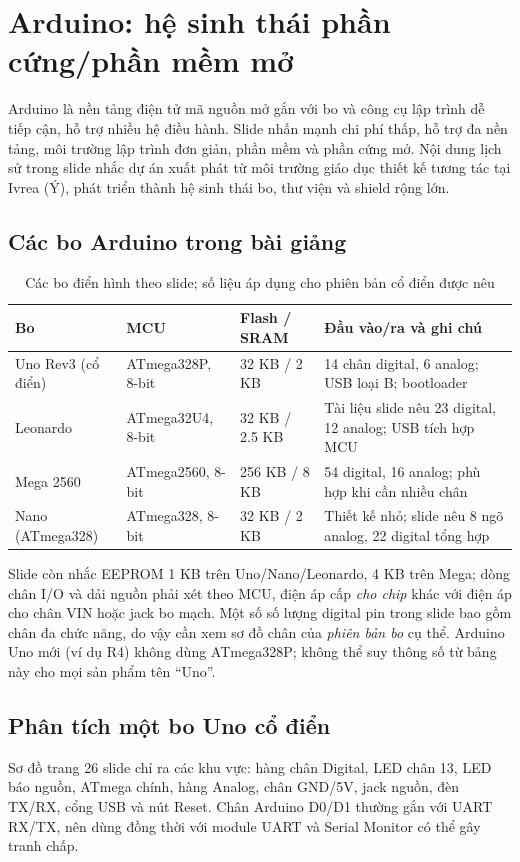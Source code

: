 \section{Arduino: hệ sinh thái phần cứng/phần mềm mở}
Arduino là nền tảng điện tử mã nguồn mở gắn với bo và công cụ lập trình dễ tiếp cận, hỗ trợ nhiều hệ điều hành. Slide nhấn mạnh chi phí thấp, hỗ trợ đa nền tảng, môi trường lập trình đơn giản, phần mềm và phần cứng mở. Nội dung lịch sử trong slide nhắc dự án xuất phát từ môi trường giáo dục thiết kế tương tác tại Ivrea (Ý), phát triển thành hệ sinh thái bo, thư viện và shield rộng lớn.

\subsection{Các bo Arduino trong bài giảng}
\begin{table}[htbp]\centering\footnotesize
\caption{Các bo điển hình theo slide; số liệu áp dụng cho phiên bản cổ điển được nêu}
\begin{tabularx}{\textwidth}{p{24mm}p{29mm}p{27mm}X}
\toprule
Bo & MCU & Flash / SRAM & Đầu vào/ra và ghi chú\\\midrule
Uno Rev3 (cổ điển) & ATmega328P, 8-bit & 32 KB / 2 KB & 14 chân digital, 6 analog; USB loại B; bootloader\\
Leonardo & ATmega32U4, 8-bit & 32 KB / 2.5 KB & Tài liệu slide nêu 23 digital, 12 analog; USB tích hợp MCU\\
Mega 2560 & ATmega2560, 8-bit & 256 KB / 8 KB & 54 digital, 16 analog; phù hợp khi cần nhiều chân\\
Nano (ATmega328) & ATmega328, 8-bit & 32 KB / 2 KB & Thiết kế nhỏ; slide nêu 8 ngõ analog, 22 digital tổng hợp\\\bottomrule
\end{tabularx}
\end{table}
Slide còn nhắc EEPROM 1 KB trên Uno/Nano/Leonardo, 4 KB trên Mega; dòng chân I/O và dải nguồn phải xét theo MCU, điện áp cấp \emph{cho chip} khác với điện áp cho chân VIN hoặc jack bo mạch. Một số số lượng digital pin trong slide bao gồm chân đa chức năng, do vậy cần xem sơ đồ chân của \emph{phiên bản bo} cụ thể. Arduino Uno mới (ví dụ R4) không dùng ATmega328P; không thể suy thông số từ bảng này cho mọi sản phẩm tên ``Uno''.

\subsection{Phân tích một bo Uno cổ điển}
Sơ đồ trang 26 slide chỉ ra các khu vực: hàng chân Digital, LED chân 13, LED báo nguồn, ATmega chính, hàng Analog, chân GND/5V, jack nguồn, đèn TX/RX, cổng USB và nút Reset. Chân Arduino D0/D1 thường gắn với UART RX/TX, nên dùng đồng thời với module UART và Serial Monitor có thể gây tranh chấp.

